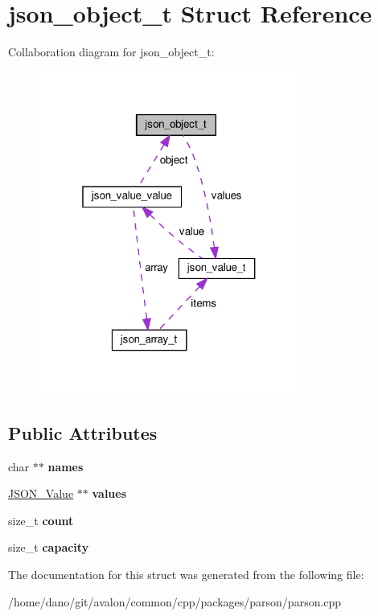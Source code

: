 \hypertarget{structjson__object__t}{}\section{json\+\_\+object\+\_\+t Struct Reference}
\label{structjson__object__t}


Collaboration diagram for json\+\_\+object\+\_\+t\+:
\nopagebreak
\begin{figure}[H]
\begin{center}
\leavevmode
\includegraphics[width=241pt]{structjson__object__t__coll__graph}
\end{center}
\end{figure}
\subsection*{Public Attributes}
\begin{DoxyCompactItemize}
\item 
\mbox{\label{structjson__object__t_a476e936d99ecad39e9addb4c56e728aa}} 
char $\ast$$\ast$ {\bfseries names}
\item 
\mbox{\label{structjson__object__t_a16420d4a051949043d4c6415dfd65811}} 
\hyperlink{structjson__value__t}{J\+S\+O\+N\+\_\+\+Value} $\ast$$\ast$ {\bfseries values}
\item 
\mbox{\label{structjson__object__t_a051459bbcb6abb5482807c06a3c01930}} 
size\+\_\+t {\bfseries count}
\item 
\mbox{\label{structjson__object__t_a4ad2b64ec6d929ced851ff490f82372f}} 
size\+\_\+t {\bfseries capacity}
\end{DoxyCompactItemize}


The documentation for this struct was generated from the following file\+:\begin{DoxyCompactItemize}
\item 
/home/dano/git/avalon/common/cpp/packages/parson/parson.\+cpp\end{DoxyCompactItemize}

